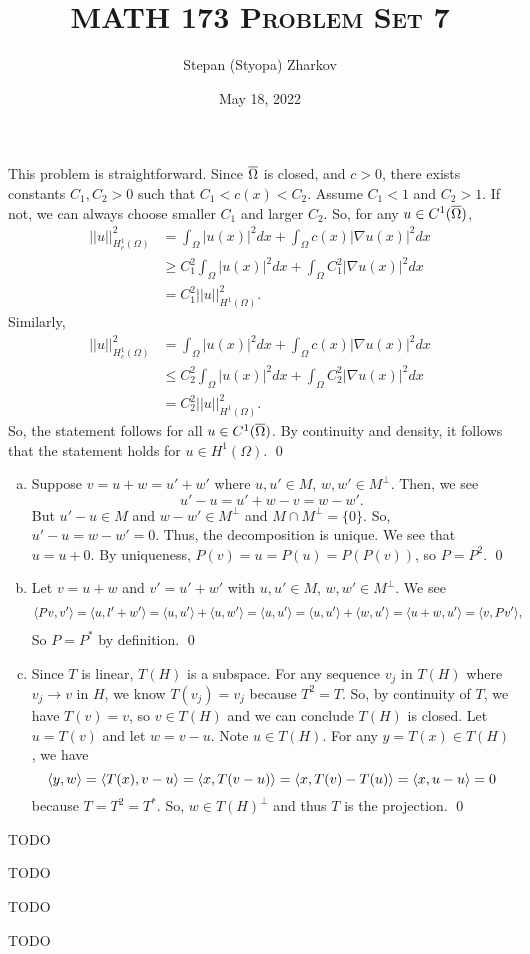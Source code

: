 \documentclass{article}
\title{\textsc{MATH 173 Problem Set 7}}
\author{Stepan (Styopa) Zharkov}
\date{May 18, 2022}
\newcommand{\D}{\nabla}
\begin{document}
\maketitle
{} 
 \tri
\hop 
\solution
This problem is straightforward. Since ${\overline{\Omega}}$ is closed, and $c > 0$, there exists constants $C_1, C_2 >0$ such that $C_1 < c(x) < C_2$. Assume $C_1 < 1$ and $C_2 > 1$. If not, we can always choose smaller $C_1$ and larger $C_2$. So, for any $u \in C^1({\overline{\Omega}})$, 
\begin{align*}
    ||u||^2_{H^1_c(\Omega)} &= \int_\Omega |u(x)|^2 dx + \int_\Omega c(x) |\D u (x)|^2 dx \\
    &\ge C_1^2\int_\Omega |u(x)|^2 dx + \int_\Omega C_1^2|\D u (x)|^2 dx\\
    &= C_1^2||u||^2_{H^1(\Omega)}.
\end{align*}
Similarly, 
\begin{align*}
    ||u||^2_{H^1_c(\Omega)} &= \int_\Omega |u(x)|^2 dx + \int_\Omega c(x) |\D u (x)|^2 dx \\
    &\le C_2^2\int_\Omega |u(x)|^2 dx + \int_\Omega C_2^2|\D u (x)|^2 dx\\
    &= C_2^2||u||^2_{H^1(\Omega)}.
\end{align*}
So, the statement follows for all  $u \in C^1({\overline{\Omega}})$. By continuity and density, it follows that the statement holds for $u \in H^1(\Omega)$. \qed
\newpage
{} 
 \tri
\hop 
\solution
\begin{enumerate}[(a)]
    \item Suppose $v = u+w = u' + w'$ where $u,u' \in M$, $w, w' \in M^\perp$. Then, we see 
    \[u' - u = u'+w - v = w - w'.\]
    But $u'-u \in M$ and $w - w' \in M^\perp$ and $M \cap M^\perp = \{0\}$. So, $u' - u = w-w' = 0$. Thus, the decomposition is unique. 
    \hop 
    We see that $u = u+0$. By uniqueness, $P(v) = u = P(u) = P(P(v))$, so $P = P^2$. \qed
    \item Let $v = u+w$ and $v' = u'+w'$ with $u,u' \in M$, $w, w' \in M^\perp$. We see 
    \begin{align*}
        \langle Pv, v'\rangle  &= \langle u, l'+w'\rangle = \langle u, u'\rangle + \langle u,w'\rangle = \langle u, u'\rangle = \langle u,u'\rangle+\langle w, u'\rangle = \langle u+w, u'\rangle = \langle v, Pv'\rangle,
    \end{align*}
    So $P = P^*$ by definition. \qed 
    \item Since $T$ is linear, $T(H)$ is a subspace. For any sequence $v_j$ in $T(H)$ where $v_j \to v$ in $H$, we know $T(v_j) = v_j$ because $T^2 = T$. So, by continuity of $T$, we have $T(v) = v$, so $v \in T(H)$ and we can conclude $T(H)$ is closed. 
    \hop 
    Let $u = T(v)$ and let $w = v - u$. Note $u \in T(H)$. For any $y = T(x) \in T(H)$, we have 
    \[\langle y, w\rangle = \langle T(x), v- u\rangle = \langle x, T(v-u)\rangle = \langle x, T(v)- T(u)\rangle = \langle x, u- u\rangle = 0\]
    because $T = T^2 = T^*$. So, $w\in T(H)^\perp$ and thus $T$ is the projection. \qed
\end{enumerate}

\newpage
{} 
 \tri
\hop 
\solution
TODO

\newpage
{} 
 \tri
\hop 
\solution
TODO

\newpage
{} 
 \tri
\hop 
\solution
TODO

\newpage
{} 
 \tri
\hop 
\solution
TODO
\end{document}

